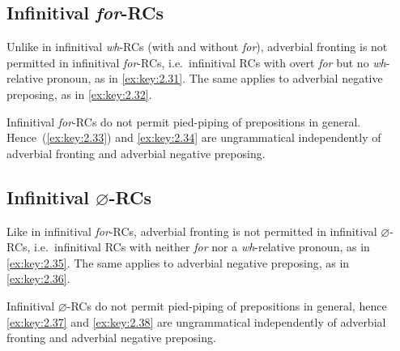 \documentclass[output=paper]{langsci/langscibook}
\begin{document}
\subsection{Infinitival \emph{for}-RCs}

Unlike in infinitival \emph{wh}{-\glspl{RC} (with and without} \emph{for}), adverbial
fronting is not permitted in infinitival \emph{for}{-RCs, i.e.\ infinitival RCs
with overt} \emph{for} but no \emph{wh}{-relative pronoun}, as in \eqref{ex:key:2.31}. The
same applies to adverbial negative preposing, as in \eqref{ex:key:2.32}.

\ea\label{ex:key:2.31}
    \z
\z

\ea\label{ex:key:2.32}
    \z
\z
Infinitival \emph{for}-\glspl{RC} do not permit pied-piping of prepositions in
general. Hence~(\ref{ex:key:2.33}) and \eqref{ex:key:2.34} are ungrammatical independently of adverbial
fronting and adverbial negative preposing.

\label{ex:key:2.33}
\z

\label{ex:key:2.34}
\z

\subsection{Infinitival $\varnothing$-RCs}

Like in infinitival \emph{for}{-RCs, adverbial fronting is not permitted in
infinitival} $\varnothing${-RCs, i.e.\ infinitival \glspl{RC} with neither} \emph{for} nor
a \emph{wh}{-relative pronoun}, as in \eqref{ex:key:2.35}. The same applies to adverbial
negative preposing, as in \eqref{ex:key:2.36}.

\label{ex:key:2.35}
\z

\label{ex:key:2.36}
\z
Infinitival $\varnothing${-\glspl{RC} do not permit pied-pi}ping of prepositions in
general, hence \eqref{ex:key:2.37} and \eqref{ex:key:2.38} are ungrammatical independently of adverbial
fronting and adverbial negative preposing.
\end{document}
